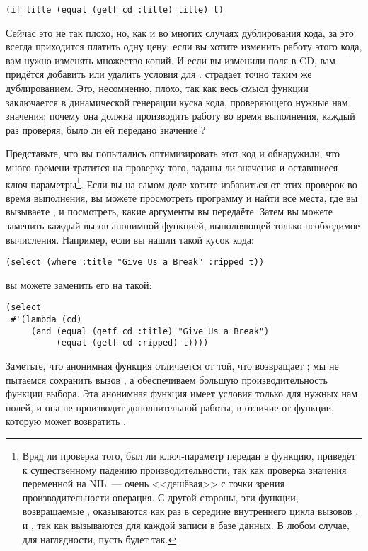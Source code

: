 \begin{lstlisting}
(if title (equal (getf cd :title) title) t)
\end{lstlisting}

Сейчас это не так плохо, но, как и во многих случаях дублирования кода, за это всегда
приходится платить одну цену: если вы хотите изменить работу этого кода, вам нужно
изменять множество копий. И если вы изменили поля в CD, вам придётся добавить или удалить
условия для .  страдает точно таким же дублированием. Это,
несомненно, плохо, так как весь смысл функции  заключается в динамической
генерации куска кода, проверяющего нужные нам значения; почему она должна производить
работу во время выполнения, каждый раз проверяя, было ли ей передано значение
?

Представьте, что вы попытались оптимизировать этот код и обнаружили, что много времени
тратится на проверку того, заданы ли значения  и оставшиеся
ключ-параметры\footnote{Вряд ли проверка того, был ли ключ-параметр передан в функцию,
  приведёт к существенному падению производительности, так как проверка значения
  переменной на NIL~--- очень <<дешёвая>> с точки зрения производительности операция. С
  другой стороны, эти функции, возвращаемые , оказываются как раз в середине
  внутреннего цикла вызовов ,  и , так как
  вызываются для каждой записи в базе данных. В любом случае, для наглядности, пусть будет
  так.}. Если вы на самом деле хотите избавиться от этих проверок во время выполнения, вы
можете просмотреть программу и найти все места, где вы вызываете , и
посмотреть, какие аргументы вы передаёте. Затем вы можете заменить каждый вызов
 анонимной функцией, выполняющей только необходимое вычисления. Например, если
вы нашли такой кусок кода:

\begin{lstlisting}
(select (where :title "Give Us a Break" :ripped t))
\end{lstlisting}

вы можете заменить его на такой:

\begin{lstlisting}
(select
 #'(lambda (cd)
     (and (equal (getf cd :title) "Give Us a Break")
          (equal (getf cd :ripped) t))))
\end{lstlisting}

Заметьте, что анонимная функция отличается от той, что возвращает ; мы не
пытаемся сохранить вызов , а обеспечиваем большую производительность функции
выбора. Эта анонимная функция имеет условия только для нужных нам полей, и она не
производит дополнительной работы, в отличие от функции, которую может возвратить
.


